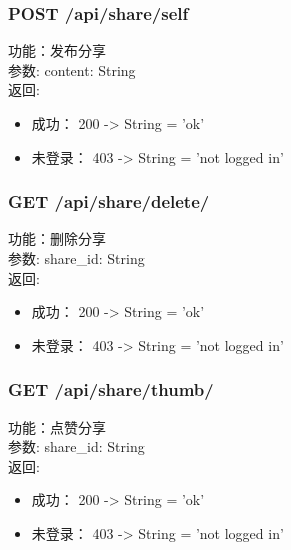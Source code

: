 \fi


	\subsubsection{POST /api/share/self}
	\noindent
	功能：发布分享\\
	参数: content: String\\
	返回:
	\begin{itemize}
		\item 成功： 200 -> String = 'ok'
		\item 未登录： 403 -> String = 'not logged in'
	\end{itemize}



	\subsubsection{GET /api/share/delete/}
	\noindent
	功能：删除分享\\
	参数: share\_id: String\\
返回:
\begin{itemize}
	\item 成功： 200 -> String = 'ok'
	\item 未登录： 403 -> String = 'not logged in'
\end{itemize}



	\subsubsection{GET /api/share/thumb/}
	\noindent
	功能：点赞分享\\
	参数: share\_id: String\\
	返回:
	\begin{itemize}
		\item 成功： 200 -> String = 'ok'
		\item 未登录： 403 -> String = 'not logged in'
	\end{itemize}



